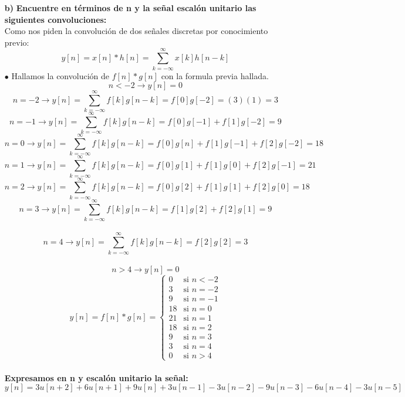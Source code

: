 \documentclass[11pt,a4paper]{article}
\begin{document}
{{\begin{enumerate}
\begin{figure}[h]
\centering
\texttt{[image: ../Imagenes de señales problema 2/expone.png]} 
\caption{Código en Matlab y gráfica de h[n]}
\label{Gráfica_hn}
\end{figure}
	\item[\textbf{b)}]
	\textbf{Encuentre en términos de n y la señal escalón unitario las siguientes convoluciones:}\\
Como nos piden la convolución de dos señales discretas por conocimiento previo:
$$\boxed{y[n]=x[n]*h[n]=\sum_{k=-\infty}^{\infty}x[k]h[n-k]}$$
$\bullet$ Hallamos la convolución de $f[n]*g[n]$ con la formula previa hallada.
$$n<-2 \rightarrow y[n]=0$$
$$n=-2 \rightarrow y[n]=\sum_{k=-\infty}^{\infty}f[k]g[n-k]=f[0]g[-2]=(3)(1)=3$$
$$n=-1 \rightarrow y[n]=\sum_{k=-\infty}^{\infty}f[k]g[n-k]=f[0]g[-1]+f[1]g[-2]=9$$
$$n=0 \rightarrow y[n]=\sum_{k=-\infty}^{\infty}f[k]g[n-k]=f[0]g[n]+f[1]g[-1]+f[2]g[-2]=18$$
$$n=1 \rightarrow y[n]=\sum_{k=-\infty}^{\infty}f[k]g[n-k]=f[0]g[1]+f[1]g[0]+f[2]g[-1]=21$$
$$n=2 \rightarrow y[n]=\sum_{k=-\infty}^{\infty}f[k]g[n-k]=f[0]g[2]+f[1]g[1]+f[2]g[0]=18$$
$$n=3 \rightarrow y[n]=\sum_{k=-\infty}^{\infty}f[k]g[n-k]=f[1]g[2]+f[2]g[1]=9$$\\
$$n=4 \rightarrow y[n]=\sum_{k=-\infty}^{\infty}f[k]g[n-k]=f[2]g[2]=3$$\\
$$n>4 \rightarrow y[n]=0$$
\begin{equation*}
y[n]=f[n]*g[n] =
\begin{cases}
0 & \text{si $n<-2 $}\\
3 & \text{si $n= -2$}\\
9 & \text{si $n= -1$}\\
18 & \text{si $n= 0$}\\
21 & \text{si $n= 1$}\\
18 & \text{si $n= 2$}\\
9 & \text{si $n= 3$}\\
3 & \text{si $n=4$}\\
0 & \text{si $n>4$}
\end{cases}
\end{equation*}\\
\textbf{Expresamos en n y escalón unitario la señal:}
$$\boxed{y[n]=3u[n+2]+6u[n+1]+9u[n]+3u[n-1]-3u[n-2]-9u[n-3]-6u[n-4]-3u[n-5]}$$


\end{enumerate}}}
\end{document}
